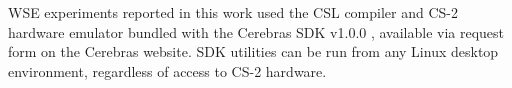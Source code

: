 WSE experiments reported in this work used the CSL compiler and CS-2 hardware emulator bundled with the Cerebras SDK v1.0.0 \citep{selig2022cerebras}, available via request form on the Cerebras website.
SDK utilities can be run from any Linux desktop environment, regardless of access to CS-2 hardware.

